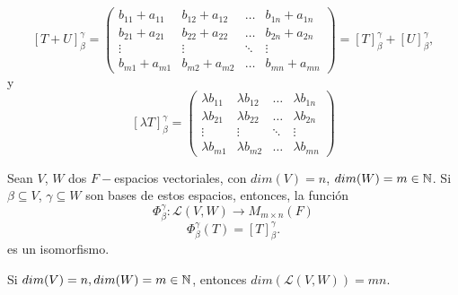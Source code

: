 \[
[T + U]_{\beta}^{\gamma} = 
\begin{pmatrix}
	b_{11} + a_{11} & b_{12} + a_{12} & \ldots & b_{1n} + a_{1n} \\
	b_{21} + a_{21} & b_{22} + a_{22} & \ldots & b_{2n} + a_{2n} \\
	\vdots & \vdots & \ddots & \vdots \\
	b_{m1} + a_{m1} & b_{m2} + a_{m2} & \ldots & b_{mn} + a_{mn}
\end{pmatrix}
= [T]_{\beta}^{\gamma} + [U]_{\beta}^{\gamma},
\]
y 
\[
[\lambda T]_{\beta}^{\gamma}
= 
\begin{pmatrix}
	\lambda b_{11} & \lambda b_{12} & \ldots & \lambda b_{1n} \\
	\lambda b_{21} & \lambda b_{22} & \ldots & \lambda b_{2n} \\
	\vdots & \vdots & \ddots & \vdots \\
	\lambda b_{m1} & \lambda b_{m2} & \ldots & \lambda b_{mn}
\end{pmatrix}
\]
\QEDB
\vspace{0.2cm}


\begin{cor}
	Sean $V$, $W$ dos $F-$espacios vectoriales, con 
	$dim(V) = n$, $dim(W) = m \in \mathbb{N}$. Si 
	$\beta \subseteq V$, $\gamma \subseteq W$
	son bases de estos espacios, entonces, la función
	\[
	\Phi_{\beta}^{\gamma} : \mathcal{L}(V, W) \longrightarrow M_{m \times n}(F)
	\]
	\[
	\Phi_{\beta}^{\gamma}(T) = [T]_{\beta}^{\gamma}.
	\]
	es un isomorfismo.
\end{cor}

\begin{cor}
	Si $dim(V) = n, dim(W) = m \in \mathbb{N}$, entonces
	$dim(\mathcal{L}(V, W)) = m n $.
\end{cor}


